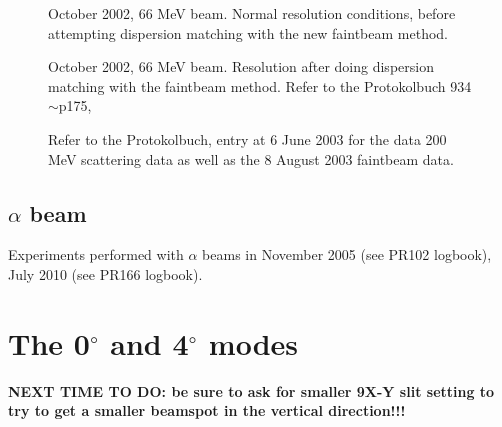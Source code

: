 \documentclass[11pt]{report}
\begin{document}
\begin{figure}[!ht]
\centerline{\vspace{0cm}\hspace{0cm}
}
\centering
\caption{October 2002, 66 MeV beam.
Normal resolution conditions, before attempting dispersion matching with the new
faintbeam method.  }
\label{fig:66mev-resolution1}
\end{figure} 


\begin{figure}[!ht]
\centerline{\vspace{0cm}\hspace{0cm}
}
\centering
\caption{October 2002, 66 MeV beam.
Resolution after doing dispersion matching with the faintbeam method.
Refer to the Protokolbuch 934 $\sim$p175,
}
\label{fig:66mev-resolution2}
\end{figure} 



\begin{figure}[!ht]
\centerline{\vspace{0cm}\hspace{0cm}
}
\centering
\caption{Refer to the Protokolbuch, entry at 6 June 2003 for the data 200 MeV scattering
data as well as the 8 August 2003 faintbeam data.}
\label{fig:200mev-resolution}
\end{figure} 

\section{$\alpha$ beam}
Experiments performed with $\alpha$ beams in November 2005 (see PR102 logbook), July 2010 (see PR166 logbook).


\clearpage



\chapter{The 0$^{\circ}$ and 4$^{\circ}$ modes}\label{chap:The0degreeMode}


{\bf NEXT TIME TO DO: be sure to ask for smaller 9X-Y slit setting to
try to get a smaller beamspot in the vertical direction!!!}

\end{document}
